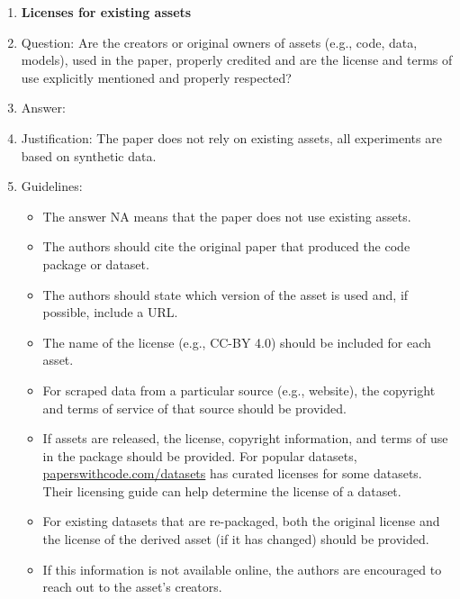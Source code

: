 \documentclass{article}
\begin{document}
\begin{enumerate}
\item {\bf Licenses for existing assets}
    \item[] Question: Are the creators or original owners of assets (e.g., code, data, models), used in the paper, properly credited and are the license and terms of use explicitly mentioned and properly respected?
    \item[] Answer: \answerNA{} %
    \item[] Justification: The paper does not rely on existing assets, all experiments are based on synthetic data.
    \item[] Guidelines:
    \begin{itemize}
        \item The answer NA means that the paper does not use existing assets.
        \item The authors should cite the original paper that produced the code package or dataset.
        \item The authors should state which version of the asset is used and, if possible, include a URL.
        \item The name of the license (e.g., CC-BY 4.0) should be included for each asset.
        \item For scraped data from a particular source (e.g., website), the copyright and terms of service of that source should be provided.
        \item If assets are released, the license, copyright information, and terms of use in the package should be provided. For popular datasets, \url{paperswithcode.com/datasets} has curated licenses for some datasets. Their licensing guide can help determine the license of a dataset.
        \item For existing datasets that are re-packaged, both the original license and the license of the derived asset (if it has changed) should be provided.
        \item If this information is not available online, the authors are encouraged to reach out to the asset's creators.
    \end{itemize}


\end{enumerate}
\end{document}
